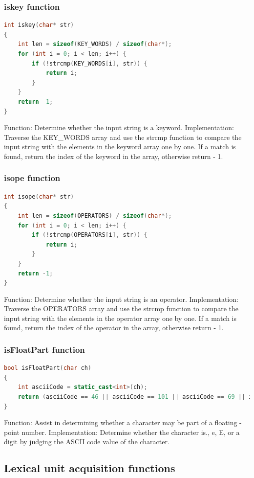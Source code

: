 \documentclass[a4paper,12pt]{article}
\begin{document}
\subsubsection{iskey function}
\begin{lstlisting}[language=c++]
int iskey(char* str)
{
    int len = sizeof(KEY_WORDS) / sizeof(char*);
    for (int i = 0; i < len; i++) {
        if (!strcmp(KEY_WORDS[i], str)) {
            return i;
        }
    }
    return -1;
}
\end{lstlisting}
Function: Determine whether the input string is a keyword.
Implementation: Traverse the KEY\_WORDS array and use the strcmp function to compare the input string with the elements in the keyword array one by one. If a match is found, return the index of the keyword in the array, otherwise return - 1.

\subsubsection{isope function}
\begin{lstlisting}[language=c++]
int isope(char* str)
{
    int len = sizeof(OPERATORS) / sizeof(char*);
    for (int i = 0; i < len; i++) {
        if (!strcmp(OPERATORS[i], str)) {
            return i;
        }
    }
    return -1;
}
\end{lstlisting}
Function: Determine whether the input string is an operator.
Implementation: Traverse the OPERATORS array and use the strcmp function to compare the input string with the elements in the operator array one by one. If a match is found, return the index of the operator in the array, otherwise return - 1.

\subsubsection{isFloatPart function}
\begin{lstlisting}[language=c++]
bool isFloatPart(char ch)
{
    int asciiCode = static_cast<int>(ch);
    return (asciiCode == 46 || asciiCode == 101 || asciiCode == 69 || isdigit(static_cast<int>(ch)));
}
\end{lstlisting}
Function: Assist in determining whether a character may be part of a floating - point number.
Implementation: Determine whether the character is., e, E, or a digit by judging the ASCII code value of the character.

\subsection{Lexical unit acquisition functions}
\end{document}
